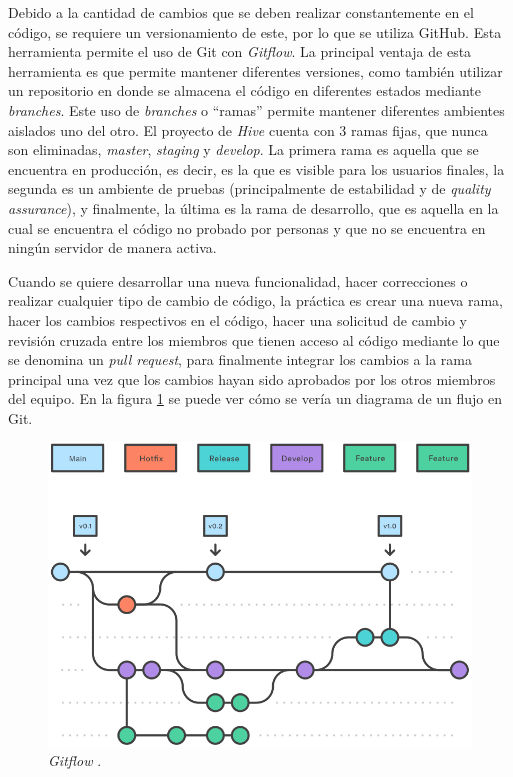     Debido a la cantidad de cambios que se deben realizar constantemente en el código, se requiere un versionamiento de este, por lo que se utiliza GitHub. Esta herramienta permite el uso de Git con \textit{Gitflow}. La principal ventaja de esta herramienta es que permite mantener diferentes versiones, como también utilizar un repositorio en donde se almacena el código en diferentes estados mediante \textit{branches}. Este uso de \textit{branches} o ``ramas'' permite mantener diferentes ambientes aislados uno del otro. El proyecto de \textit{Hive} cuenta con 3 ramas fijas, que nunca son eliminadas, \textit{master}, \textit{staging} y \textit{develop}. La primera rama es aquella que se encuentra en producción, es decir, es la que es visible para los usuarios finales, la segunda es un ambiente de pruebas (principalmente de estabilidad y de \textit{quality assurance}), y finalmente, la última es la rama de desarrollo, que es aquella en la cual se encuentra el código no probado por personas y que no se encuentra en ningún servidor de manera activa. 
    
    Cuando se quiere desarrollar una nueva funcionalidad, hacer correcciones o realizar cualquier tipo de cambio de código, la práctica es crear una nueva rama, hacer los cambios respectivos en el código, hacer una solicitud de cambio y revisión cruzada entre los miembros que tienen acceso al código mediante lo que se denomina un \textit{pull request}, para finalmente integrar los cambios a la rama principal una vez que los cambios hayan sido aprobados por los otros miembros del equipo. En la figura \ref{fig:gitflow_diagram} se puede ver cómo se vería un diagrama de un flujo en Git.
    
    \begin{figure}
        \centering
        \includegraphics[width=0.65\linewidth]{figures/gitflow.png}
        \caption{\textit{Gitflow} \protect\cite{gitflow_diagram}.}
        \label{fig:gitflow_diagram}
    \end{figure}
    
